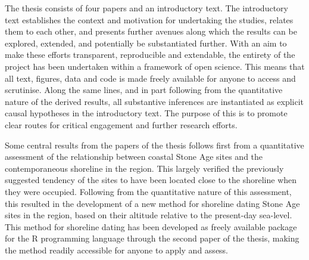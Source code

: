 The thesis consists of four papers and an introductory text. The introductory text establishes the context and motivation for undertaking the studies, relates them to each other, and presents further avenues along which the results can be explored, extended, and potentially be substantiated further. With an aim to make these efforts transparent, reproducible and extendable, the entirety of the project has been undertaken within a framework of open science. This means that all text, figures, data and code is made freely available for anyone to access and scrutinise. Along the same lines, and in part following from the quantitative nature of the derived results, all substantive inferences are instantiated as explicit causal hypotheses in the introductory text. The purpose of this is to promote clear routes for critical engagement and further research efforts.  

Some central results from the papers of the thesis follows first from a quantitative assessment of the relationship between coastal Stone Age sites and the contemporaneous shoreline in the region. This largely verified the previously suggested tendency of the sites to have been located close to the shoreline when they were occupied. Following from the quantitative nature of this assessment, this resulted in the development of a new method for shoreline dating Stone Age sites in the region, based on their altitude relative to the present-day sea-level. This method for shoreline dating has been developed as freely available package for the R programming language through the second paper of the thesis, making the method readily accessible for anyone to apply and assess. 

